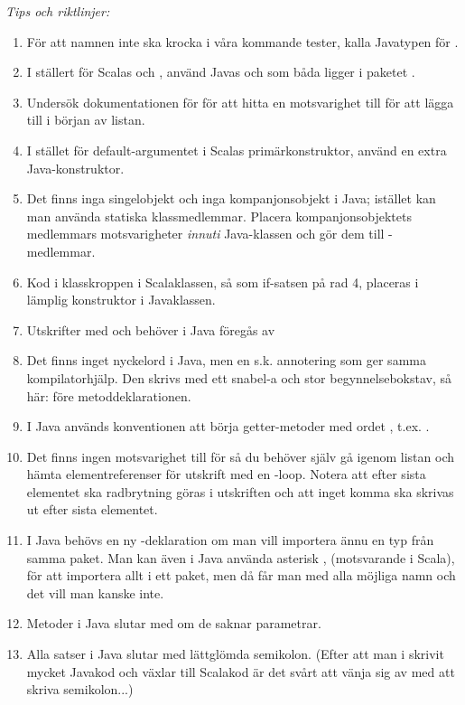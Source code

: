 \emph{Tips och riktlinjer:}
\begin{enumerate}
\item För att namnen inte ska krocka i våra kommande tester, kalla Javatypen för .
\item  I ställert för Scalas  och , använd Javas  och  som båda ligger i paketet .
\item Undersök dokumentationen för  för att hitta en motsvarighet till  för att lägga till i början av listan.
\item I stället för default-argumentet i Scalas primärkonstruktor, använd en extra Java-konstruktor.
\item Det finns inga singelobjekt och inga kompanjonsobjekt i Java; istället kan man använda statiska klassmedlemmar. Placera kompanjonsobjektets medlemmars motsvarigheter \emph{innuti} Java-klassen och gör dem till -medlemmar.
\item Kod i klasskroppen i Scalaklassen, så som if-satsen på rad 4, placeras i lämplig konstruktor i Javaklassen.
\item Utskrifter med  och  behöver i Java föregås av 
\item Det finns inget nyckelord  i Java, men en s.k. annotering som ger samma kompilatorhjälp. Den skrivs med ett snabel-a och stor begynnelsebokstav, så här:   före metoddeklarationen.
\item I Java används konventionen att börja getter-metoder med ordet , t.ex. .
\item Det finns ingen motsvarighet till  för  så du behöver själv gå igenom listan och hämta elementreferenser för utskrift med en -loop. Notera att efter sista elementet ska radbrytning göras i utskriften och att inget komma ska skrivas ut efter sista elementet.
\item I Java behövs en ny -deklaration om man vill importera ännu en typ från samma paket. Man kan även i Java använda asterisk \code{*}, (motsvarande \code{_} i Scala), för att importera allt i ett paket, men då får man med alla möjliga namn och det vill man kanske inte.
\item Metoder i Java slutar med \code{()} om de saknar parametrar.
\item Alla satser i Java slutar med lättglömda semikolon. (Efter att man i skrivit mycket Javakod och växlar till Scalakod är det svårt att vänja sig av med att skriva semikolon...)
\end{enumerate}


